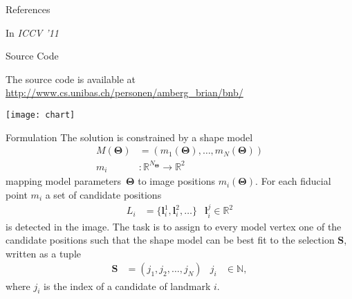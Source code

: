 \documentclass[portrait,final,a0paper,fontscale=0.277]{baposter}
\newcommand*{\VEC}[1]  {\ensuremath{\boldsymbol{#1}}}
\newcommand{\SNN}{\ensuremath{\mathbb N}}
\newcommand{\SRR}{\ensuremath{\mathbb R}}
\renewcommand{\l}{\VEC l}
\newcommand{\Selection}{\mathbf{S}}
\newcommand{\Params}{\VEC\Theta}
\begin{document}
\begin{poster}
\begin{posterbox}[name=references,column=0,above=bottom]{References}
\begin{thebibliography}{1}
        \newblock In {\em ICCV '11}
      \end{thebibliography}
   \vspace{0.3em}
  \end{posterbox}
  \begin{posterbox}[name=source,column=2,above=bottom]{Source Code}
  \noindent
  \begin{minipage}{\linewidth}
  \begin{minipage}{0.75\linewidth}
    \indent{}The source code is available at \\
    \url{http://www.cs.unibas.ch/personen/amberg_brian/bnb/}
  \end{minipage}\hfill%
  \begin{minipage}{0.23\linewidth}
  \hfill\texttt{[image: chart]}
  \end{minipage}
  \end{minipage}
  \end{posterbox}
  \begin{posterbox}[name=formulation,column=0,below=contribution,above=references]{Formulation}
The solution is constrained by a shape model
\begin{align}
  M(\Params) &= (m_1(\Params), \dots, m_N(\Params))\\
   m_i &: \SRR^{N_{\Params}}\to\SRR^2\nonumber
\end{align}
mapping model parameters~$\Params$ to image positions $m_i(\Params)$.
For each fiducial point $m_i$ a set of candidate positions 
\begin{align}
 L_i &= \{\l_i^1, \l_i^2, \dots\} & \l_i^j \in \SRR^2
\end{align}
is detected in the image.
The task is to assign to every model vertex one of the candidate positions
such that the shape model can be best fit to the selection $\Selection{}$, written as a tuple 
\begin{align}
  \Selection &=(j_1, j_2, \dots, j_N) & j_i &\in \SNN,\label{eqn:selection}
\end{align}
where $j_i$ is the index of a candidate of landmark $i$. 


\end{posterbox}
\end{poster}
\end{document}
